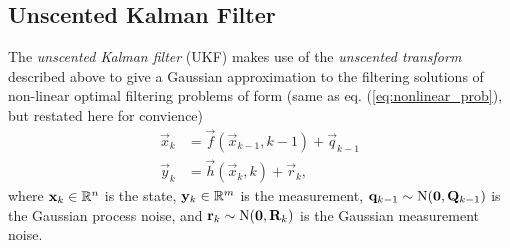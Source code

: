%
\subsection{Unscented Kalman Filter}
%

The {\it unscented Kalman filter} (UKF) \citep{Julier+Uhlmann+Durrant-Whyte:1995, Julier+Uhlmann:2004, Wan+Merwe:2001} makes use of the {\it
unscented transform} described above to give a Gaussian approximation
to the filtering solutions of non-linear optimal filtering problems of
form (same as eq. (\ref{eq:nonlinear_prob}), but restated here for
convience)
%
\begin{equation}
\begin{split} \vec{x}_{k} &= \vec{f}(\vec{x}_{k-1},k-1) +
\vec{q}_{k-1} \\ \vec{y}_{k} &= \vec{h}(\vec{x}_{k},k) + \vec{r}_{k},
\end{split}
\end{equation}
%
where $\mathbf{x}_k \in \mathbb{R}^n$ is the state, $\mathbf{y}_k \in
\mathbb{R}^m$ is the measurement, $\mathbf{q}_{k-1} \sim
\operatorname{N}(\mathbf{0},\mathbf{Q}_{k-1})$ is the Gaussian process noise, and
$\mathbf{r}_{k} \sim \operatorname{N}(\mathbf{0},\mathbf{R}_{k})$ is the Gaussian measurement
noise.

